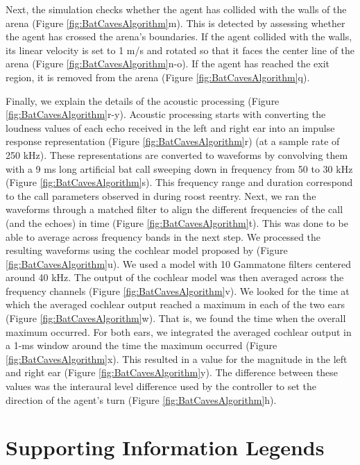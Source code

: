 \documentclass[a4paper, 11pt]{article}
\newcommand{\flow}[1]{Figure \ref{fig:BatCavesAlgorithm}#1}
\begin{document}
Next, the simulation checks whether the agent has collided with the walls of the arena (\flow{m}). This is detected by assessing whether the agent has crossed the arena's boundaries. If the agent collided with the walls, its linear velocity is set to 1 m/s and rotated so that it faces the center line of the arena (\flow{n-o}). If the agent has reached the exit region, it is removed from the arena (\flow{q}).

Finally, we explain the details of the acoustic processing (\flow{r-y}). Acoustic processing starts with converting the loudness values of each echo received in the left and right ear into an impulse response representation (\flow{r}) (at a sample rate of 250 kHz). These representations are converted to waveforms by convolving them with a 9 ms long artificial bat call sweeping down in frequency from 50 to 30 kHz (\flow{s}). This frequency range and duration correspond to the call parameters \citet{Kloepper2018} observed in  during roost reentry. Next, we ran the waveforms through a matched filter to align the different frequencies of the call (and the echoes) in time (\flow{t}). This was done to be able to average across frequency bands in the next step. We processed the resulting waveforms using the cochlear model proposed by \citet{Wiegrebe2008} (\flow{u}). We used a model with 10 Gammatone filters \citep[as implemented in][]{Hohmann2002} centered around 40 kHz. The output of the cochlear model was then averaged across the frequency channels (\flow{v}). We looked for the time at which the averaged cochlear output reached a maximum in each of the two ears (\flow{w}). That is, we found the time when the overall maximum occurred. For both ears, we integrated the averaged cochlear output in a 1-ms window around the time the maximum occurred (\flow{x}). This resulted in a value for the magnitude in the left and right ear (\flow{y}). The difference between these values was the interaural level difference used by the controller to set the direction of the agent's turn (\flow{h}).




\section*{Supporting Information Legends}
\end{document}
